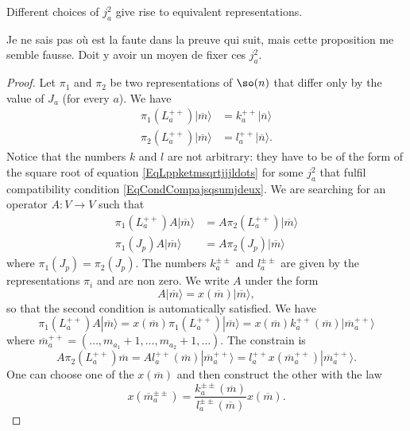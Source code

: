 \begin{proposition}
	Different choices of $j_a^2$ give rise to equivalent representations.
\end{proposition}

\begin{probleme}
	Je ne sais pas où est la faute dans la preuve qui suit, mais cette proposition me semble fausse. Doit y avoir un moyen de fixer ces $j_a^2$.
\end{probleme}

\begin{proof}
	Let $\pi_1$ and $\pi_2$ be two representations of $\so(n)$ that differ only by the value of $J_a$ (for every $a$). We have
	\begin{subequations}
		\begin{align}
			\pi_1(L_a^{++})| \overline{ m } \rangle&=k_a^{++}| \overline{ n } \rangle\\
			\pi_2(L_a^{++})| \overline{ m } \rangle&=l_a^{++}| \overline{ n } \rangle.
		\end{align}
	\end{subequations}
	Notice that the numbers $k$ and $l$ are not arbitrary: they have to be of the form of the square root of equation \eqref{EqLppketmsqrtjjjldots} for some $j_a^2$ that fulfil compatibility condition \eqref{EqCondCompajsqsumjdeux}. We are searching for an operator $A\colon V\to V$ such that
	\begin{subequations}
		\begin{align}
			\pi_1(L_a^{++})A| \overline{ m } \rangle&= A\pi_2(L_a^{++})| \overline{ m } \rangle\\
			\pi_1(J_p)A| \overline{ m } \rangle&= A\pi_2(J_p)| \overline{ m } \rangle
		\end{align}
	\end{subequations}
	where $\pi_1(J_p)=\pi_2(J_p)$. The numbers $k_a^{\pm\pm}$ and $l_a^{\pm\pm}$ are given by the representations $\pi_i$ and are non zero. We write $A$ under the form
	\begin{equation}
		A| \overline{ m } \rangle=x(\overline{ m })|\overline{ m } \rangle,
	\end{equation}
	so that the second condition is automatically satisfied. We have
	\begin{equation}
		\pi_1(L_a^{++})A| \overline{ m } \rangle=x(\overline{ m })\pi_1(L_a^{++})| \overline{ m } \rangle=x(\overline{ m })k_a^{++}(\overline{ m })| \overline{ m }_a^{++} \rangle
	\end{equation}
	where $\overline{ m }_a^{++}=(\ldots, m_{a_1}+1,\ldots,m_{a_2}+1,\ldots)$. The constrain is
	\begin{equation}
		A\pi_2(L_a^{++})\overline{ m }=Al_a^{++}(\overline{ m })| \overline{ m }_a^{++} \rangle=l_a^{++}x(\overline{ m }_a^{++})| \overline{ m }_a^{++} \rangle.
	\end{equation}
	One can choose one of the $x(\overline{ m })$ and then construct the other with the law
	\begin{equation}
		x(\overline{ m }_a^{\pm\pm})=\frac{ k_a^{\pm\pm}(\overline{ m }) }{ l_a^{\pm\pm}(\overline{ m }) }x(\overline{ m }).
	\end{equation}
\end{proof}
